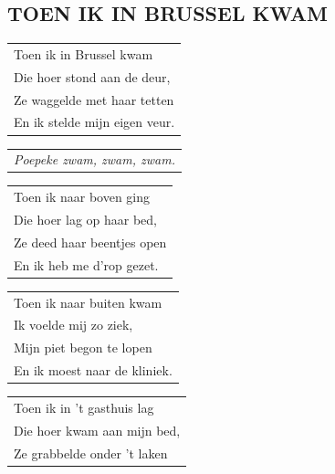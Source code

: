 \documentclass[a4paper, 14pt]{extarticle}
\begin{document}
\subsection*{TOEN IK IN BRUSSEL KWAM}
\begin{flushleft}
\begin{tabularx}{0.8\textwidth} {
   >{\raggedright\arraybackslash}X}
   Toen ik in Brussel kwam\\
Die hoer stond aan de deur,\\
Ze waggelde met haar tetten\\
En ik stelde mijn eigen veur.\\
\end{tabularx}
\end{flushleft}\begin{flushleft}
\begin{tabularx}{0.8\textwidth} {
   >{\raggedright\arraybackslash}X}
\textit{Poepeke zwam, zwam, zwam.}\\
\end{tabularx}
\end{flushleft}\begin{flushleft}
\begin{tabularx}{0.8\textwidth} {
   >{\raggedright\arraybackslash}X}
   Toen ik naar boven ging\\
Die hoer lag op haar bed,\\
Ze deed haar beentjes open\\
En ik heb me d’rop gezet.\\
\end{tabularx}
\end{flushleft}\begin{flushleft}
\begin{tabularx}{0.8\textwidth} {
   >{\raggedright\arraybackslash}X}Toen ik naar buiten kwam\\
Ik voelde mij zo ziek,\\
Mijn piet begon te lopen\\
En ik moest naar de kliniek.\\
\end{tabularx}
\end{flushleft}\begin{flushleft}
\begin{tabularx}{0.8\textwidth} {
   >{\raggedright\arraybackslash}X}Toen ik in ’t gasthuis lag\\
Die hoer kwam aan mijn bed,\\
Ze grabbelde onder ’t laken\\

\end{tabularx}
\end{flushleft}
\end{document}
